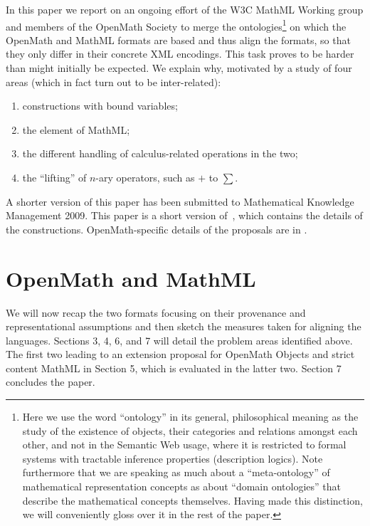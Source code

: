 \documentclass{llncs}
\begin{document}
In this paper we report on an ongoing effort of the W3C MathML Working group and members
of the OpenMath Society to merge the ontologies\footnote{Here we use the word ``ontology''
  in its general, philosophical meaning as the study of the existence of objects, their
  categories and relations amongst each other, and not in the Semantic Web usage, where it
  is restricted to formal systems with tractable inference properties (description
  logics). Note furthermore that we are speaking as much about a ``meta-ontology'' of
  mathematical representation concepts as about ``domain ontologies'' that describe the
  mathematical concepts themselves. Having made this distinction, we will
  conveniently gloss over it in the rest of the paper.} on which the OpenMath and MathML formats
are based and thus align the formats, so that they only differ in their concrete XML
encodings. This task proves to be harder than might initially be expected.  We explain
why, motivated by a study of four areas (which in fact turn out to be inter-related):
\begin{enumerate}
\item constructions with bound variables;
\item the {} element of MathML;
\item the different handling of calculus-related operations in the two;
\item the ``lifting'' of $n$-ary operators, such as $+$ to $\sum$.
\end{enumerate}

\iffull A shorter version of this paper has been submitted to Mathematical Knowledge Management 2009.
\else This paper is a short version of~\cite{DavenportKohlhase2009b}, which contains the details
of the constructions.\fi{} OpenMath-specific details of the proposals are in
\cite{DavenportKohlhase2009c,DavenportKohlhase2009d}.

\section{OpenMath and MathML}\label{sec:formatsnhistory}
We will now recap the two formats focusing on their provenance and representational
assumptions and then sketch the measures taken for aligning the languages. Sections 3, 4,
6, and 7 will detail the problem areas identified above. The first two leading to an
extension proposal for OpenMath Objects and strict content MathML in Section 5, which is
evaluated in the latter two. Section 7 concludes the paper.
\end{document}
